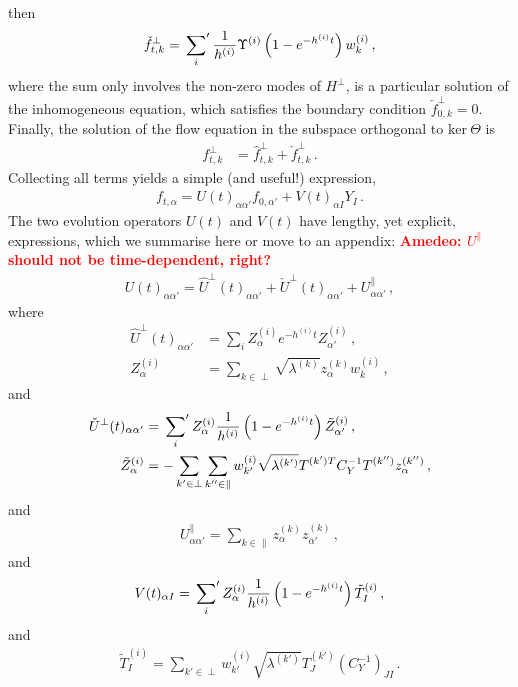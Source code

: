 \documentclass[11pt]{article}
\newcommand{\ac}[1]{\textcolor{red}{\textbf{Amedeo: #1}}}
\begin{document}
then
\begin{align}
    \label{eq:PartSol}
    \check{f}^\perp_{t,k} = \sideset{}{'}\sum_{i} \frac{1}{h^{(i)}} \Upsilon^{(i)}
        \left(1 - e^{-h^{(i)}t}\right) w^{(i)}_k\, ,
\end{align}
where the sum only involves the non-zero modes of $H^\perp$,
is a particular solution of the inhomogeneous equation, which satisfies the boundary
condition $\check{f}^{\perp}_{0,k}=0$. Finally, the solution of the flow equation in the subspace orthogonal to
$\text{ker}\ \Theta$ is
\begin{align}
    f^\perp_{t,k}
    \label{eq:FlowSolution}
        &= \hat{f}^\perp_{t,k} + \check{f}^\perp_{t,k}
        \, .
\end{align}
Collecting all terms yields a simple (and useful!) expression,
\begin{align}
    \label{eq:AnalyticSol}
    f_{t,\alpha}
        = U(t)_{\alpha\alpha'} f_{0,\alpha'} + V(t)_{\alpha I} Y_{I}\, .
\end{align}
The two evolution operators $U(t)$ and $V(t)$ have lengthy, yet explicit, expressions, which we
summarise here or move to an appendix: \ac{$U^\parallel$ should not be time-dependent, right?}
\begin{align}
    U(t)_{\alpha\alpha'} = \hat{U}^\perp(t)_{\alpha\alpha'}
        + \check{U}^\perp(t)_{\alpha\alpha'} + U^\parallel_{\alpha\alpha'}\, ,
\end{align}
where
\begin{align}
    \hat{U}^\perp(t)_{\alpha\alpha'}
        &= \sum_i Z^{(i)}_{\alpha} e^{-h^{(i)}t} Z^{(i)}_{\alpha'}\, , \\
    Z^{(i)}_{\alpha}
        &= \sum_{k\in\perp} \sqrt{\lambda^{(k)}} z^{(k)}_\alpha w^{(i)}_{k}\, ,
\end{align}
and
\begin{align}
    \check{U}^\perp(t)_{\alpha\alpha'}
        &= \sideset{}{'}\sum_{i} Z^{(i)}_{\alpha} \frac{1}{h^{(i)}} \left(1 - e^{-h^{(i)}t}\right) \tilde{Z}^{(i)}_{\alpha'}\, , \\
    \tilde{Z}^{(i)}_{\alpha}
        &= -\sum_{k'\in\perp} \sum_{k''\in\parallel} w^{(i)}_{k'} \sqrt{\lambda^{(k')}}
            T^{(k') T} C_Y^{-1} T^{(k'')} z^{(k'')}_{\alpha}\, ,
\end{align}
and
\begin{align}
    U^\parallel_{\alpha\alpha'}
        = \sum_{k\in\parallel} z^{(k)}_\alpha z^{(k)}_{\alpha'} \, ,
\end{align}
and
\begin{align}
    V(t)_{\alpha I} = \sideset{}{'}\sum_{i} Z^{(i)}_{\alpha} \frac{1}{h^{(i)}} \left(1 - e^{-h^{(i)}t}\right)
        \tilde{T}^{(i)}_{I}\, ,
\end{align}
and
\begin{align}
    \tilde{T}^{(i)}_{I} = \sum_{k'\in\perp} w^{(i)}_{k'} \sqrt{\lambda^{(k')}}
        T^{(k')}_J \left(C_Y^{-1}\right)_{JI}\, .
\end{align}
\end{document}
